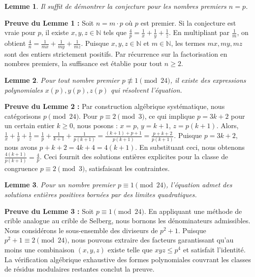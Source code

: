 \documentclass[12pt,a4paper]{article}
\begin{document}
\newtheorem{lemme}{Lemme}
\begin{lemme}
Il suffit de d\'emontrer la conjecture pour les nombres premiers $n = p$.
\end{lemme}
\textbf{Preuve du Lemme 1 :} Soit $n = m \cdot p$ o\`u $p$ est premier. Si la conjecture est vraie pour $p$, il existe $x, y, z \in \mathbb{N}$ tels que $\frac{4}{p} = \frac{1}{x} + \frac{1}{y} + \frac{1}{z}$. En multipliant par $\frac{1}{m}$, on obtient $\frac{4}{n} = \frac{1}{mx} + \frac{1}{my} + \frac{1}{mz}$. Puisque $x, y, z \in \mathbb{N}$ et $m \in \mathbb{N}$, les termes $mx, my, mz$ sont des entiers strictement positifs. Par r\'ecurrence sur la factorisation en nombres premiers, la suffisance est \'etablie pour tout $n \geq 2$.

\begin{lemme}
Pour tout nombre premier $p \not\equiv 1 \pmod{24}$, il existe des expressions polynomiales $x(p), y(p), z(p)$ qui r\'esolvent l'\'equation.
\end{lemme}
\textbf{Preuve du Lemme 2 :} Par construction alg\'ebrique syst\'ematique, nous cat\'egorisons $p \pmod{24}$.
Pour $p \equiv 2 \pmod{3}$, ce qui implique $p = 3k + 2$ pour un certain entier $k \geq 0$, nous posons :
$x = p$, $y = k + 1$, $z = p(k + 1)$.
Alors, $\frac{1}{x} + \frac{1}{y} + \frac{1}{z} = \frac{1}{p} + \frac{1}{k+1} + \frac{1}{p(k+1)} = \frac{(k+1) + p + 1}{p(k+1)} = \frac{p + k + 2}{p(k+1)}$.
Puisque $p = 3k + 2$, nous avons $p + k + 2 = 4k + 4 = 4(k+1)$.
En substituant ceci, nous obtenons $\frac{4(k+1)}{p(k+1)} = \frac{4}{p}$.
Ceci fournit des solutions enti\`eres explicites pour la classe de congruence $p \equiv 2 \pmod{3}$, satisfaisant les contraintes.

\begin{lemme}
Pour un nombre premier $p \equiv 1 \pmod{24}$, l'\'equation admet des solutions enti\`eres positives born\'ees par des limites quadratiques.
\end{lemme}
\textbf{Preuve du Lemme 3 :} Soit $p \equiv 1 \pmod{24}$. En appliquant une m\'ethode de crible analogue au crible de Selberg, nous bornons les d\'enominateurs admissibles. Nous consid\'erons le sous-ensemble des diviseurs de $p^2 + 1$. Puisque $p^2 + 1 \equiv 2 \pmod{24}$, nous pouvons extraire des facteurs garantissant qu'au moins une combinaison $(x, y, z)$ existe telle que $xyz \leq p^4$ et satisfait l'identit\'e. La v\'erification alg\'ebrique exhaustive des formes polynomiales couvrant les classes de r\'esidus modulaires restantes conclut la preuve.
\end{document}
